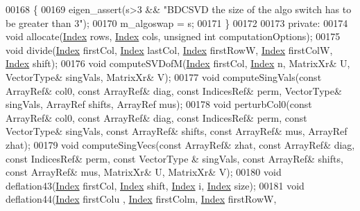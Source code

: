 \begin{DoxyCode}
00168   \{
00169     eigen\_assert(s>3 && \textcolor{stringliteral}{"BDCSVD the size of the algo switch has to be greater than 3"});
00170     m\_algoswap = s;
00171   \}
00172  
00173 \textcolor{keyword}{private}:
00174   \textcolor{keywordtype}{void} allocate(\hyperlink{namespace_eigen_a62e77e0933482dafde8fe197d9a2cfde}{Index} rows, \hyperlink{namespace_eigen_a62e77e0933482dafde8fe197d9a2cfde}{Index} cols, \textcolor{keywordtype}{unsigned} \textcolor{keywordtype}{int} computationOptions);
00175   \textcolor{keywordtype}{void} divide(\hyperlink{namespace_eigen_a62e77e0933482dafde8fe197d9a2cfde}{Index} firstCol, \hyperlink{namespace_eigen_a62e77e0933482dafde8fe197d9a2cfde}{Index} lastCol, \hyperlink{namespace_eigen_a62e77e0933482dafde8fe197d9a2cfde}{Index} firstRowW, 
      \hyperlink{namespace_eigen_a62e77e0933482dafde8fe197d9a2cfde}{Index} firstColW, \hyperlink{namespace_eigen_a62e77e0933482dafde8fe197d9a2cfde}{Index} shift);
00176   \textcolor{keywordtype}{void} computeSVDofM(\hyperlink{namespace_eigen_a62e77e0933482dafde8fe197d9a2cfde}{Index} firstCol, \hyperlink{namespace_eigen_a62e77e0933482dafde8fe197d9a2cfde}{Index} n, MatrixXr& U, VectorType& singVals, MatrixXr& V);
00177   \textcolor{keywordtype}{void} computeSingVals(\textcolor{keyword}{const} ArrayRef& col0, \textcolor{keyword}{const} ArrayRef& diag, \textcolor{keyword}{const} IndicesRef& perm, VectorType& 
      singVals, ArrayRef shifts, ArrayRef mus);
00178   \textcolor{keywordtype}{void} perturbCol0(\textcolor{keyword}{const} ArrayRef& col0, \textcolor{keyword}{const} ArrayRef& diag, \textcolor{keyword}{const} IndicesRef& perm, \textcolor{keyword}{const} VectorType& 
      singVals, \textcolor{keyword}{const} ArrayRef& shifts, \textcolor{keyword}{const} ArrayRef& mus, ArrayRef zhat);
00179   \textcolor{keywordtype}{void} computeSingVecs(\textcolor{keyword}{const} ArrayRef& zhat, \textcolor{keyword}{const} ArrayRef& diag, \textcolor{keyword}{const} IndicesRef& perm, \textcolor{keyword}{const} VectorType
      & singVals, \textcolor{keyword}{const} ArrayRef& shifts, \textcolor{keyword}{const} ArrayRef& mus, MatrixXr& U, MatrixXr& V);
00180   \textcolor{keywordtype}{void} deflation43(\hyperlink{namespace_eigen_a62e77e0933482dafde8fe197d9a2cfde}{Index} firstCol, \hyperlink{namespace_eigen_a62e77e0933482dafde8fe197d9a2cfde}{Index} shift, \hyperlink{namespace_eigen_a62e77e0933482dafde8fe197d9a2cfde}{Index} i, \hyperlink{namespace_eigen_a62e77e0933482dafde8fe197d9a2cfde}{Index} size);
00181   \textcolor{keywordtype}{void} deflation44(\hyperlink{namespace_eigen_a62e77e0933482dafde8fe197d9a2cfde}{Index} firstColu , \hyperlink{namespace_eigen_a62e77e0933482dafde8fe197d9a2cfde}{Index} firstColm, \hyperlink{namespace_eigen_a62e77e0933482dafde8fe197d9a2cfde}{Index} firstRowW, 

\end{DoxyCode}
